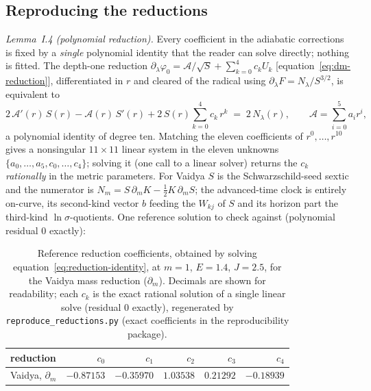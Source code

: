 \documentclass[12pt]{iopart}
\begin{document}
\subsection{Reproducing the reductions}
\label{app:reproduce}
\emph{Lemma~I.4 (polynomial reduction).} Every coefficient in the adiabatic corrections is fixed by a \emph{single} polynomial identity that the reader can solve directly; nothing is fitted. The
depth-one reduction $\partial_\lambda\varphi_0=\mathcal{A}/\sqrt S+\sum_{k=0}^4 c_k
U_k$ [equation~\eqref{eq:dm-reduction}], differentiated in $r$ and
cleared of the radical using $\partial_\lambda F=N_\lambda/S^{3/2}$, is equivalent to
\begin{equation}
    2\,\mathcal{A}'(r)\,S(r)-\mathcal{A}(r)\,S'(r)
    +2\,S(r)\sum_{k=0}^4 c_k\,r^k \;=\; 2\,N_\lambda(r),
    \qquad \mathcal{A}=\sum_{i=0}^5 a_i r^i,
    \label{eq:reduction-identity}
\end{equation}
a polynomial identity of degree ten. Matching the eleven coefficients of
$r^0,\dots,r^{10}$ gives a nonsingular $11\times11$ linear system in the eleven
unknowns $\{a_0,\dots,a_5,c_0,\dots,c_4\}$; solving it (one call to a linear solver)
returns the $c_k$ \emph{rationally} in the metric parameters. For Vaidya $S$ is the
Schwarzschild-seed sextic and the numerator is
$N_m=S\,\partial_m K-\tfrac12K\,\partial_m S$; the advanced-time clock is entirely
on-curve, its second-kind vector $b$ feeding the $W_{kj}$ of $S$ and its horizon part the
third-kind $\ln\sigma$-quotients. One reference solution to check against (polynomial
residual $0$ exactly):
\begin{table}[htbp]
    \centering
    \caption{Reference reduction coefficients, obtained by solving
    equation~\eqref{eq:reduction-identity}, at $m{=}1$, $E{=}1.4$, $J{=}2.5$, for the Vaidya
    mass reduction ($\partial_m$). Decimals are shown for readability; each $c_k$ is the
    exact rational solution of a single linear solve (residual $0$ exactly), regenerated
    by \texttt{reproduce\_reductions.py} (exact coefficients in the reproducibility
    package).}
    \label{tab:reduction-ck}
    \small
    \begin{tabular}{lrrrrr}
        \hline\hline
        reduction & $c_0$ & $c_1$ & $c_2$ & $c_3$ & $c_4$\\
        \hline
        Vaidya, $\partial_m$ & $-0.87153$ & $-0.35970$ & $1.03538$ & $0.21292$ & $-0.18939$\\
        \hline\hline
    \end{tabular}
\end{table}
\end{document}

